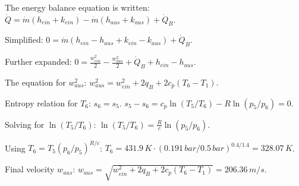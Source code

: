 The energy balance equation is written:  
\( \dot{Q} = \dot{m} (h_{ein} + k_{ein}) - \dot{m} (h_{aus} + k_{aus}) + \dot{Q}_B \).  

Simplified:  
\( 0 = \dot{m} (h_{ein} - h_{aus} + k_{ein} - k_{aus}) + \dot{Q}_B \).  

Further expanded:  
\( 0 = \frac{w_{ein}^2}{2} - \frac{w_{aus}^2}{2} + \dot{Q}_B + h_{ein} - h_{aus} \).  

The equation for \( w_{aus}^2 \):  
\( w_{aus}^2 = w_{ein}^2 + 2q_B + 2c_p (T_6 - T_1) \).  

Entropy relation for \( T_6 \):  
\( s_6 = s_5 \).  
\( s_5 - s_6 = c_p \ln(T_5 / T_6) - R \ln(p_5 / p_6) = 0 \).  

Solving for \( \ln(T_5 / T_6) \):  
\( \ln(T_5 / T_6) = \frac{R}{c} \ln(p_5 / p_6) \).  

Using \( T_6 = T_5 (p_6 / p_5)^{R/c} \):  
\( T_6 = 431.9 \, K \cdot (0.191 \, bar / 0.5 \, bar)^{0.4 / 1.4} = 328.07 \, K \).  

Final velocity \( w_{aus} \):  
\( w_{aus} = \sqrt{w_{ein}^2 + 2q_B + 2c_p (T_6 - T_1)} = 206.36 \, m/s \).